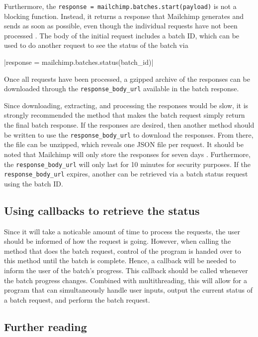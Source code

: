 \documentclass[11pt]{article}
\begin{document}
\inputminted[linenos=true]{python}{mailchimp_examples/batch_request.py}

Furthermore, the \texttt{response = mailchimp.batches.start(payload)} is not a blocking function. Instead, it returns a response that Mailchimp generates and sends as soon as possible, even though the individual requests have not been processed \cite{mailchimp-batch}. The body of the initial request includes a batch ID, which can be used to do another request to see the status of the batch via

|response = mailchimp.batches.status(batch_id)|

\noindent
Once all requests have been processed, a gzipped archive of the responses can be downloaded through the \texttt{response\_body\_url} available in the batch response. 

Since downloading, extracting, and processing the responses would be slow, it is strongly recommended the method that makes the batch request simply return the final batch response. If the responses are desired, then another method should be written to use the \texttt{response\_body\_url} to download the responses. From there, the file can be unzipped, which reveals one JSON file per request. It should be noted that Mailchimp will only store the responses for seven days \cite{mailchimp-batch}. Furthermore, the \texttt{response\_body\_url} will only last for 10 minutes for security purposes. If the \texttt{response\_body\_url} expires, another can be retrieved via a batch status request using the batch ID.

\subsection{Using callbacks to retrieve the status}

Since it will take a noticable amount of time to process the requests, the user should be informed of how the request is going. However, when calling the method that does the batch request, control of the program is handed over to this method until the batch is complete. Hence, a callback will be needed to inform the user of the batch's progress. This callback should be called whenever the batch progress changes. Combined with multithreading, this will allow for a program that can simultaneously handle user inputs, output the current status of a batch request, and perform the batch request.

\subsection{Further reading}
\end{document}
